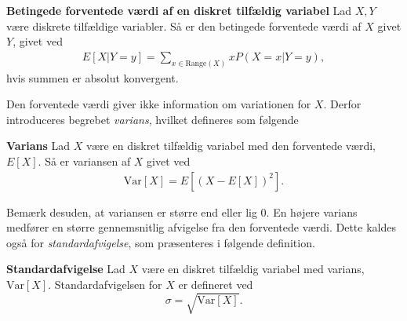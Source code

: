 \begin{minipage}\textwidth
\begin{defn}\textbf{Betingede forventede værdi af en diskret tilfældig variabel}\label{def:betinget_forventet_værdi_af_diskrete_tilfældige_variabler} %
\newline
Lad $X, Y$ være diskrete tilfældige variabler. Så er den betingede forventede værdi af $X$ givet $Y$, givet ved
\begin{align*}
    E[X|Y=y] = \sum_{x\in \text{Range}(X)}xP(X=x|Y=y),
\end{align*}
hvis summen er absolut konvergent.
\end{defn}
\end{minipage}

Den forventede værdi giver ikke information om variationen for $X$. Derfor introduceres begrebet \textit{varians}, hvilket defineres som følgende

\begin{minipage}\textwidth
\begin{defn}\textbf{Varians}\label{def:varians} %
\newline
Lad $X$ være en diskret tilfældig variabel med den forventede værdi, $E[X]$. Så er variansen af $X$ givet ved
\begin{align*}
    \text{Var}[X]=E\left[\left(X-E[X]\right)^2\right].
\end{align*}
\end{defn}
\end{minipage}



Bemærk desuden, at variansen er større end eller lig $0$. En højere varians medfører en større gennemsnitlig afvigelse fra den forventede værdi. Dette kaldes også for \textit{standardafvigelse}, som præsenteres i følgende definition.

\begin{minipage}\textwidth
\begin{defn}\label{def:standardafvigelse}\textbf{Standardafvigelse} %
\newline
Lad $X$ være en diskret tilfældig variabel med varians, $\text{Var}[X]$. Standardafvigelsen for $X$ er defineret ved
$$\sigma = \sqrt{\text{Var}[X]}.$$
\end{defn}
\end{minipage}

